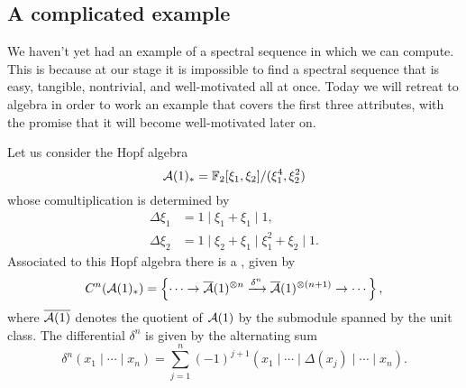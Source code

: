 \begin{subappendices}
\section{A complicated example}\label{ComplicatedExampleSec}

We haven't yet had an example of a spectral sequence in which we can compute.
This is because at our stage it is impossible to find a spectral sequence that is easy, tangible, nontrivial, and well-motivated all at once.
Today we will retreat to algebra in order to work an example that covers the first three attributes, with the promise that it will become well-motivated later on.

Let us consider the Hopf algebra \[\mathcal A(1)_* = \mathbb F_2[\xi_1, \xi_2] / (\xi_1^4, \xi_2^2)\] whose comultiplication is determined by%
\begin{align*}
\Delta \xi_1 & = 1 \mid \xi_1 + \xi_1 \mid 1, \\
\Delta \xi_2 & = 1 \mid \xi_2 + \xi_1 \mid \xi_1^2 + \xi_2 \mid 1.
\end{align*}
Associated to this Hopf algebra there is a , given by \[C^n(\mathcal A(1)_*) = \left\{\cdots \to \overline {\mathcal A}(1)^{\otimes n} \xrightarrow{\delta^n} \overline {\mathcal A}(1)^{\otimes (n+1)} \to \cdots \right\},\] where $\overline{\mathcal A(1)}$ denotes the quotient of $\mathcal A(1)$ by the submodule spanned by the unit class.
The differential $\delta^n$ is given by the alternating sum \[\delta^n(x_1 \mid \cdots \mid x_n) = \sum_{j=1}^n (-1)^{j+1} \left(x_1 \mid \cdots \mid \Delta(x_j) \mid \cdots \mid x_n\right).\]


\end{subappendices}
